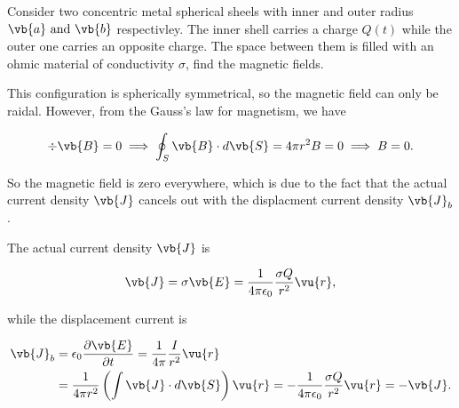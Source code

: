 \documentclass[english,a4paper,12pt]{report}
\begin{document}
{Consider two concentric metal spherical sheels with inner and outer radius \(\vb{a} \text { and } \vb{b} \) respectivley. The inner shell carries a charge \(Q(t)\) while the outer one carries an opposite charge. The space between them is filled with an ohmic material of conductivity \(\sigma \), find the magnetic fields.   }
{This configuration is spherically symmetrical, so the magnetic field can only be raidal. However, from the Gauss's law for magnetism, we have 

\begin{equation}
    \div{\vb{B} } =0 \implies \oint_{S} \vb{B} \cdot d\vb{S} = 4\pi r^2B = 0 \implies B=0.
\end{equation}

So the magnetic field is zero everywhere, which is due to the fact that the actual current density \(\vb{J} \) cancels out with the displacment current density \(\vb{J} _{b} \).

The actual current density \(\vb{J} \) is 

\begin{equation}
    \vb{J} = \sigma \vb{E} = \frac{1}{4\pi \epsilon_0} \frac{\sigma Q}{r^2}\vu{r}, 
\end{equation}

while the displacement current is 

\begin{equation}
    \begin{aligned} 
    \vb{J} _{b} &= \epsilon_0 \frac{\partial \vb{E} }{\partial t} = \frac{1}{4\pi } \frac{I}{r^2}\vu{r} \\
    &= \frac{1}{4\pi r^2}\left( \int \vb{J} \cdot d\vb{S} \right)\vu{r} = -\frac{1}{4\pi \epsilon_0} \frac{\sigma Q}{r^2}\vu{r} = -\vb{J} . 
    \end{aligned} 
\end{equation}





} 
\end{document}
